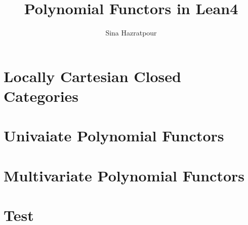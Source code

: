 
\title{Polynomial Functors in Lean4}
\author{Sina Hazratpour}


\maketitle

\chapter{Locally Cartesian Closed Categories}

\chapter{Univaiate Polynomial Functors}

\chapter{Multivariate Polynomial Functors}

\chapter{Test}


% 


